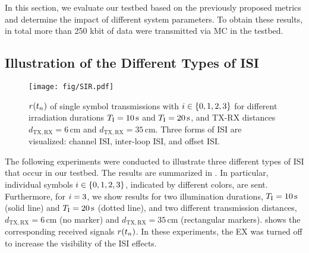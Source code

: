 In this section, we evaluate our testbed based on the previously proposed metrics and determine the impact of different system parameters. To obtain these results, in total more than 250 kbit of data were transmitted via \ac{MC} in the testbed.
%
\scaleSubsection
\subsection{Illustration of the Different Types of ISI}\label{subsubsec:concret_char_ISI}
\scaleSubsectionBelow
%
\begin{figure}[!tbp]
\centering
\vspace*{-0.5cm}
  \texttt{[image: fig/SIR.pdf]}
  \vspace*{-8mm}
  \caption{$r(t_n)$ of single symbol transmissions with $i \in \{0, 1, 2, 3\}$ for different irradiation durations $T_{\mathrm{I}} = 10 \,\si{\second}$ and $T_{\mathrm{I}} = 20 \,\si{\second}$, and \ac{TX}-\ac{RX} distances $d_{\mathrm{TX},\mathrm{RX}} = 6 \,\si{\centi\meter}$ and $d_{\mathrm{TX},\mathrm{RX}} = 35 \,\si{\centi\meter}$. Three forms of \ac{ISI} are visualized: channel \ac{ISI}, inter-loop \ac{ISI}, and offset \ac{ISI}.}
  \label{fig:SIR}
  \vspace*{-0.9cm}
\end{figure}
%
The following experiments were conducted to illustrate three different types of \ac{ISI} that occur in our testbed. The results are summarized in . In particular, individual symbols $i \in \{0, 1, 2, 3\}$, indicated by different colors, are sent. Furthermore, for $i = 3$, we show results for two illumination durations, $T_{\mathrm{I}}= 10 \,\si{\second}$ (solid line) and $T_{\mathrm{I}} = 20 \,\si{\second}$ (dotted line), and two different transmission distances, $d_{\mathrm{TX},\mathrm{RX}} = 6 \, \si{\centi\meter}$ (no marker) and $d_{\mathrm{TX},\mathrm{RX}} = 35 \, \si{\centi\meter}$ (rectangular markers).  shows the corresponding received signals $r(t_n)$. In these experiments, the \ac{EX} was turned off to increase the visibility of the \ac{ISI} effects.

